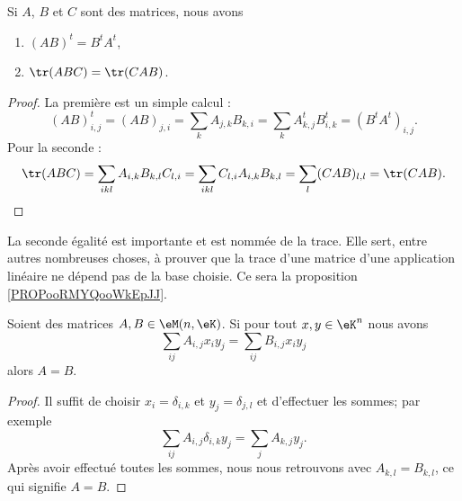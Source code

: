 \begin{lemma}        \label{LEMooUXDRooWZbMVN}
	Si \( A\), \( B\) et \( C\) sont des matrices, nous avons
	\begin{enumerate}
		\item
		      \( (AB)^t=B^tA^t\),
		\item       \label{ITEMooXDYQooAlnArd}
		      \( \tr(ABC)=\tr(CAB)\).
	\end{enumerate}
\end{lemma}

\begin{proof}
	La première est un simple calcul :
	\begin{equation}
		(AB)^t_{i,j}=(AB)_{j,i}=\sum_kA_{j,k}B_{k,i}=\sum_kA^t_{k,j}B^t_{i,k}=(B^tA^t)_{i,j}.
	\end{equation}
	Pour la seconde :
	\begin{equation}
		\tr(ABC)=\sum_{ikl}A_{i,k}B_{k,l}C_{l,i}=\sum_{ikl}C_{l,i}A_{i,k}B_{k,l}=\sum_l(CAB)_{l,l}=\tr(CAB).
	\end{equation}
\end{proof}

\begin{normaltext}
	La seconde égalité est importante et est nommée  de la trace. Elle sert, entre autres nombreuses choses, à prouver que la trace d'une matrice d'une application linéaire ne dépend pas de la base choisie. Ce sera la proposition \ref{PROPooRMYQooWkEpJJ}.
\end{normaltext}

\begin{lemma}       \label{LEMooLXAHooPRyHaF}
	Soient des matrices \( A,B\in \eM(n,\eK)\). Si pour tout \( x,y\in \eK^n\) nous avons
	\begin{equation}
		\sum_{ij}A_{i,j}x_iy_j=\sum_{ij}B_{i,j}x_iy_j
	\end{equation}
	alors \( A=B\).
\end{lemma}

\begin{proof}
	Il suffit de choisir \( x_i=\delta_{i,k}\) et \( y_j=\delta_{j,l}\) et d'effectuer les sommes; par exemple
	\begin{equation}
		\sum_{ij}A_{i,j}\delta_{i,k}y_j=\sum_jA_{k,j}y_j.
	\end{equation}
	Après avoir effectué toutes les sommes, nous nous retrouvons avec \( A_{k,l}=B_{k,l}\), ce qui signifie \( A=B\).
\end{proof}



